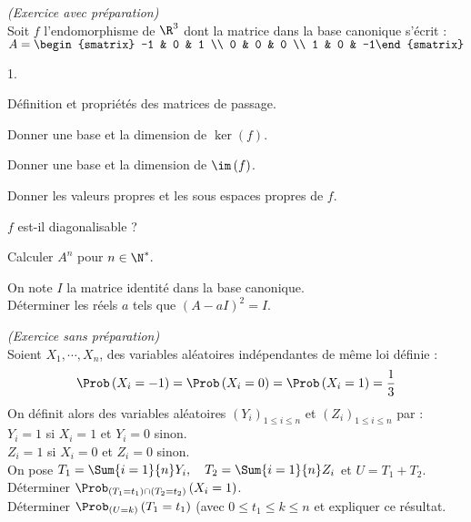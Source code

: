 \documentclass[11pt]{article}%
\begin{document}
\begin{exercice}{\it (Exercice avec préparation)}~\\
  Soit $f$ l'endomorphisme de $\R^{3}$ dont la matrice dans la base
  canonique s'écrit : $A=%
  \begin{smatrix}
    -1 & 0 & 1 \\
    0 & 0 & 0 \\
    1 & 0 & -1%
  \end{smatrix}%
  $
  \begin{noliste}{1.}
  \item Définition et propriétés des matrices de passage.

  \item Donner une base et la dimension de $\ker \left( f\right)$.

  \item Donner une base et la dimension de $\im \left( f\right)$.

  \item Donner les valeurs propres et les sous espaces propres de $f$.

  \item $f$ est-il diagonalisable ?

  \item Calculer $A^{n}$ pour $n\in \N^{\ast }.$

  \item On note $I$ la matrice identité dans la base canonique.\\
    Déterminer les réels $a$ tels que $\left( A-aI\right) ^{2}=I.$
  \end{noliste}
\end{exercice}

\addtocounter{exercice}{-1}
\begin{exercice}{\it (Exercice sans préparation)}~\\
  Soient $X_{1},\cdots ,X_{n}$, des variables aléatoires indépendantes
  de même loi définie :
  \[
  \Prob\left( X_{i}=-1\right) =\Prob\left( X_{i}=0\right)
  =\Prob \left( X_{i}=1\right) =\frac{1}{3}
  \]
  On définit alors des variables aléatoires $\left( Y_{i}\right)
  _{1\leq i\leq n}$ et $\left( Z_{i}\right) _{1\leq i\leq n}$ par
  :\\
  $Y_{i}=1$ si $X_{i}=1$ et $Y_{i}=0$ sinon.\\
  $Z_{i}=1$ si $X_{i}=0$ et $Z_{i}=0$ sinon.\\
  On pose $T_{1}=\Sum{i=1}{n}Y_{i},\quad T_{2}=\Sum{i=1}{n}Z_{i}$ et
  $U=T_{1}+T_{2}$.\\
  Déterminer $\Prob_{\left( T_{1}=t_{1}\right) \cap \left(
      T_{2}=t_{2}\right) }\left( X_{i}=1\right) $.\\
  Déterminer $\Prob_{\left( U=k\right) }\left( T_{1}=t_{1}\right)
  $ (avec $0\leq t_{1}\leq k\leq n$ et expliquer ce résultat.
\end{exercice}
\end{document}
